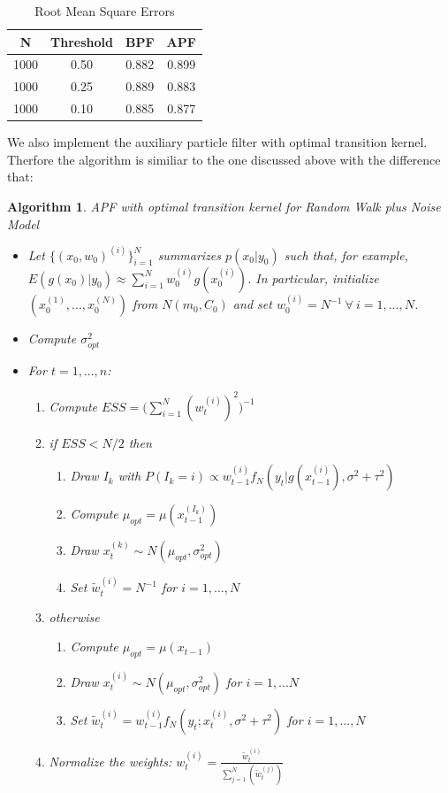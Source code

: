 \documentclass[
]{book}
\theoremstyle{break}
\theoremstyle{nonumberplain}
\newtheorem{algorithm}{Algorithm}[section]
\begin{document}
\begin{longtable}[t]{cccc}
\caption{\label{tab:unnamed-chunk-22}Root Mean Square Errors}\\
\toprule
N & Threshold & BPF & APF\\
\midrule
1000 & 0.50 & 0.882 & 0.899\\
1000 & 0.25 & 0.889 & 0.883\\
1000 & 0.10 & 0.885 & 0.877\\
\bottomrule
\end{longtable}

We also implement the auxiliary particle filter with optimal transition
kernel. Therfore the algorithm is similiar to the one discussed above
with the difference that:

\begin{algorithm}APF with optimal transition kernel for Random Walk plus Noise Model
\begin{itemize}
\item Let $\{(x_{0},w_{0})^{(i)}\}_{i=1}^{N}$ summarizes $p(x_{0}|y_{0})$ such that, for example, $E(g(x_{0})|y_{0}) \approx \sum_{i=1}^{N}w_{0}^{(i)}g(x_{0}^{(i)})$. In particular, initialize $(x_{0}^{(1)},...,x_{0}^{(N)})$ from $N(m_{0},C_{0})$ and set $w_{0}^{(i)}=N^{-1} \ \forall \ i=1,...,N$.
\item Compute $\sigma_{opt}^{2}$ 
\item For $t=1,...,n$:
\begin{enumerate}
\item Compute $ESS=\Bigg(\sum_{i=1}^{N}(w_{t}^{(i)})^{2}\Bigg)^{-1}$
\item if $ESS<N/2$ then
\begin{enumerate}
\item Draw $I_{k}$ with $P(I_{k}=i) \propto w_{t-1}^{(i)}f_{N}(y_{t}|g(x_{t-1}^{(i)}),\sigma^{2}+\tau^{2}) $
\item Compute $\mu_{opt}=\mu(x_{t-1}^{(I_{k})})$
\item Draw $x_{t}^{(k)} \sim N(\mu_{opt},\sigma^{2}_{opt})$
\item Set  $\tilde{w}^{(i)}_{t} = N^{-1}$ for $i=1,...,N$
\end{enumerate}
\item otherwise
\begin{enumerate}
\item Compute $\mu_{opt}=\mu(x_{t-1})$
\item Draw $x_{t}^{(i)} \sim N(\mu_{opt},\sigma^{2}_{opt})$ for $i=1,...N$
\item Set $\tilde{w}^{(i)}_{t}=w^{(i)}_{t-1}f_{N}(y_{t};x_{t}^{(i)},\sigma^{2}+\tau^{2})$ for $i=1,...,N$
\end{enumerate}
\item Normalize the weights: $w_{t}^{(i)}=\frac{\tilde{w}_{t}^{(i)}}{\sum_{j=1}^{N}(\tilde{w}_{t}^{(j)})}$
\end{enumerate}
\end{itemize}
\end{algorithm}
\end{document}
